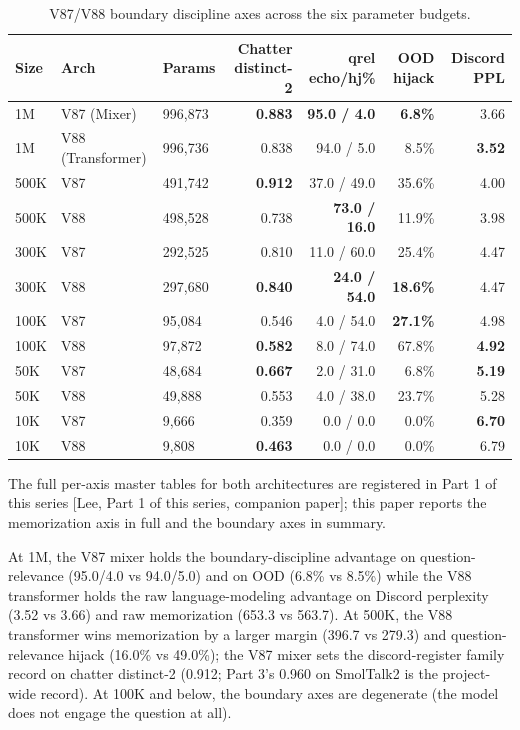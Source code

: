 \documentclass[11pt]{article}
\begin{document}
\begin{table}[!t]
\centering\footnotesize
\caption{V87/V88 boundary discipline axes across the six parameter budgets.}
\label{tab:scaling-boundary}
\begin{tabular}{lllrrrr}
\toprule
Size & Arch & Params & Chatter distinct-2 & qrel echo/hj\% & OOD hijack & Discord PPL \\
\midrule
1M & V87 (Mixer) & 996{,}873 & \textbf{0.883} & \textbf{95.0 / 4.0} & \textbf{6.8\%} & 3.66 \\
1M & V88 (Transformer) & 996{,}736 & 0.838 & 94.0 / 5.0 & 8.5\% & \textbf{3.52} \\
500K & V87 & 491{,}742 & \textbf{0.912} & 37.0 / 49.0 & 35.6\% & 4.00 \\
500K & V88 & 498{,}528 & 0.738 & \textbf{73.0 / 16.0} & 11.9\% & 3.98 \\
300K & V87 & 292{,}525 & 0.810 & 11.0 / 60.0 & 25.4\% & 4.47 \\
300K & V88 & 297{,}680 & \textbf{0.840} & \textbf{24.0 / 54.0} & \textbf{18.6\%} & 4.47 \\
100K & V87 & 95{,}084 & 0.546 & 4.0 / 54.0 & \textbf{27.1\%} & 4.98 \\
100K & V88 & 97{,}872 & \textbf{0.582} & 8.0 / 74.0 & 67.8\% & \textbf{4.92} \\
50K & V87 & 48{,}684 & \textbf{0.667} & 2.0 / 31.0 & 6.8\% & \textbf{5.19} \\
50K & V88 & 49{,}888 & 0.553 & 4.0 / 38.0 & 23.7\% & 5.28 \\
10K & V87 & 9{,}666 & 0.359 & 0.0 / 0.0 & 0.0\% & \textbf{6.70} \\
10K & V88 & 9{,}808 & \textbf{0.463} & 0.0 / 0.0 & 0.0\% & 6.79 \\
\bottomrule
\end{tabular}
\end{table}

The full per-axis master tables for both architectures are registered in Part 1 of this series [Lee, Part 1 of this series, companion paper]; this paper reports the memorization axis in full and the boundary axes in summary.

At 1M, the V87 mixer holds the boundary-discipline advantage on question-relevance (95.0/4.0 vs 94.0/5.0) and on OOD (6.8\% vs 8.5\%) while the V88 transformer holds the raw language-modeling advantage on Discord perplexity (3.52 vs 3.66) and raw memorization (653.3 vs 563.7). At 500K, the V88 transformer wins memorization by a larger margin (396.7 vs 279.3) and question-relevance hijack (16.0\% vs 49.0\%); the V87 mixer sets the discord-register family record on chatter distinct-2 (0.912; Part 3's 0.960 on SmolTalk2 is the project-wide record). At 100K and below, the boundary axes are degenerate (the model does not engage the question at all).
\end{document}
